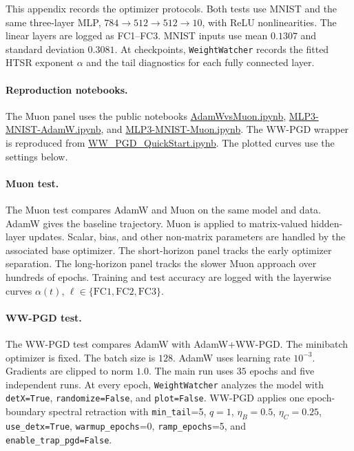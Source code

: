 \documentclass[10pt,twocolumn]{article}
\newcommand{\WW}{\texttt{WeightWatcher}}
\begin{document}
This appendix records the optimizer protocols. Both tests use MNIST and the same three-layer MLP, $784\rightarrow512\rightarrow512\rightarrow10$, with ReLU nonlinearities. The linear layers are logged as FC1--FC3. MNIST inputs use mean $0.1307$ and standard deviation $0.3081$. At checkpoints, \WW{} records the fitted HTSR exponent $\alpha$ and the tail diagnostics for each fully connected layer.

\paragraph{Reproduction notebooks.}
The Muon panel uses the public notebooks \href{https://github.com/CalculatedContent/WeightWatcher-Examples/blob/main/AdamWvsMuon.ipynb}{AdamWvsMuon.ipynb}, \href{https://github.com/CalculatedContent/WeightWatcher-Examples/blob/main/MLP3-MNIST-AdamW.ipynb}{MLP3-MNIST-AdamW.ipynb}, and \href{https://github.com/CalculatedContent/WeightWatcher-Examples/blob/main/MLP3-MNIST-Muon.ipynb}{MLP3-MNIST-Muon.ipynb}. The WW-PGD wrapper is reproduced from \href{https://github.com/CalculatedContent/WW_PGD/blob/main/WW_PGD_QuickStart.ipynb}{WW\_PGD\_QuickStart.ipynb}. The plotted curves use the settings below.

\paragraph{Muon test.}
The Muon test compares AdamW and Muon on the same model and data. AdamW gives the baseline trajectory. Muon is applied to matrix-valued hidden-layer updates. Scalar, bias, and other non-matrix parameters are handled by the associated base optimizer. The short-horizon panel tracks the early optimizer separation. The long-horizon panel tracks the slower Muon approach over hundreds of epochs. Training and test accuracy are logged with the layerwise curves $\alpha(t)$, $\ell\in\{\mathrm{FC1},\mathrm{FC2},\mathrm{FC3}\}$.

\paragraph{WW-PGD test.}
The WW-PGD test compares AdamW with AdamW+WW-PGD. The minibatch optimizer is fixed. The batch size is $128$. AdamW uses learning rate $10^{-3}$. Gradients are clipped to norm $1.0$. The main run uses $35$ epochs and five independent runs. At every epoch, \WW{} analyzes the model with \texttt{detX=True}, \texttt{randomize=False}, and \texttt{plot=False}. WW-PGD applies one epoch-boundary spectral retraction with \texttt{min\_tail}=5, $q=1$, $\eta_B=0.5$, $\eta_C=0.25$, \texttt{use\_detx=True}, \texttt{warmup\_epochs}=0, \texttt{ramp\_epochs}=5, and \texttt{enable\_trap\_pgd=False}.
\end{document}
